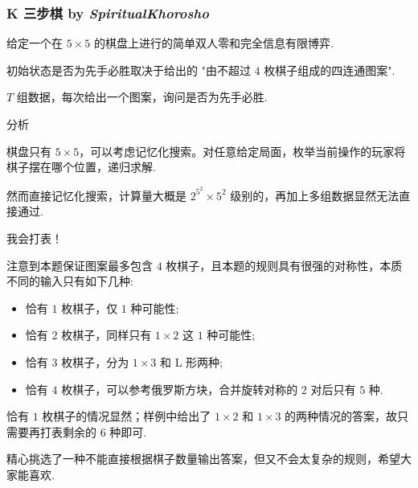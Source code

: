 \frame
{
  \frametitle{K 三步棋 {by \itshape SpiritualKhorosho}}

  	给定一个在 $5\times 5$ 的棋盘上进行的简单双人零和完全信息有限博弈.

	初始状态是否为先手必胜取决于给出的 "由不超过 $4$ 枚棋子组成的四连通图案".

	$T$ 组数据，每次给出一个图案，询问是否为先手必胜.
}

\begin{frame}{分析}

	棋盘只有 $5\times 5$，可以考虑记忆化搜索。对任意给定局面，枚举当前操作的玩家将棋子摆在哪个位置，递归求解.

	然而直接记忆化搜索，计算量大概是 $2^{5^2}\times 5^2$ 级别的，再加上多组数据显然无法直接通过.

\end{frame}

\begin{frame}{我会打表！}

	注意到本题保证图案最多包含 $4$ 枚棋子，且本题的规则具有很强的对称性，本质不同的输入只有如下几种:

	\begin{itemize}
	\item 恰有 $1$ 枚棋子，仅 $1$ 种可能性;
	\item 恰有 $2$ 枚棋子，同样只有 $1\times 2$ 这 $1$ 种可能性;
	\item 恰有 $3$ 枚棋子，分为 $1\times 3$ 和 L 形两种;
	\item 恰有 $4$ 枚棋子，可以参考俄罗斯方块，合并旋转对称的 $2$ 对后只有 $5$ 种.
	\end{itemize}

	恰有 $1$ 枚棋子的情况显然；样例中给出了 $1\times 2$ 和 $1\times 3$ 的两种情况的答案，故只需要再打表剩余的 $6$ 种即可.\pause

	精心挑选了一种不能直接根据棋子数量输出答案，但又不会太复杂的规则，希望大家能喜欢.

\end{frame}